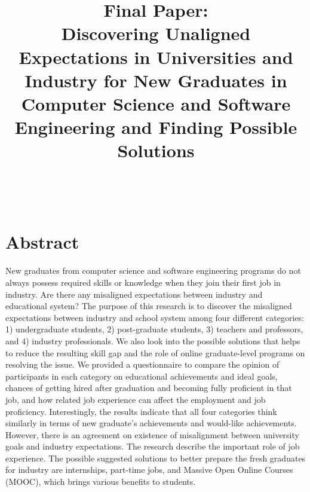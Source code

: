 \documentclass{sigchi}
\begin{document}
\title{Final Paper:\\ Discovering Unaligned Expectations in Universities and Industry for New Graduates in Computer Science and Software Engineering and Finding Possible Solutions}

\author{%
  \\
  \\
}

\maketitle

\section{Abstract}
 New graduates from computer science and software engineering programs do not always possess required skills or knowledge when they join their first job in industry. Are there any misaligned expectations between industry and educational system? The purpose of this research is to discover the misaligned expectations between industry and school system among four different categories: 1) undergraduate students, 2) post-graduate students, 3) teachers and professors, and 4) industry professionals. We also look into the possible solutions that helps to reduce the resulting skill gap and the role of online graduate-level programs on resolving the issue. We provided a questionnaire to compare the opinion of participants in each category on educational achievements and ideal goals, chances of getting hired after graduation and becoming fully proficient in that job, and how related job experience can affect the employment and job proficiency. Interestingly, the results indicate that all four categories think similarly in terms of new graduate's achievements and would-like achievements. However, there is an agreement on existence of misalignment between university goals and industry expectations. The research describe the important role of job experience. The possible suggested solutions to better prepare the fresh graduates for industry are internships, part-time jobs, and Massive Open Online Courses (MOOC), which brings various benefits to students.
  
\end{document}

